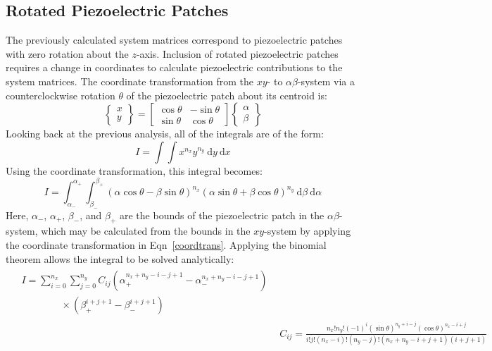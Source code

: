 \documentclass[thesis]{fputhesis}
\begin{document}
\begin{body}
\begin{appendices}
\subsection{Rotated Piezoelectric Patches}
The previously calculated system matrices correspond to piezoelectric patches with zero rotation about the $z$-axis. Inclusion of rotated piezoelectric patches requires a change in coordinates to calculate piezoelectric contributions to the system matrices. The coordinate transformation from the $xy$- to $\alpha\beta$-system via a counterclockwise rotation $\theta$ of the piezoelectric patch about its centroid is:
\begin{equation}\label{coordtrans}
\begin{Bmatrix} x \\ y \end{Bmatrix}
=\begin{bmatrix} \cos{\theta} & -\sin{\theta} \\ \sin{\theta} & \cos{\theta} \end{bmatrix}
\begin{Bmatrix} \alpha \\ \beta \end{Bmatrix}
\end{equation}
Looking back at the previous analysis, all of the integrals are of the form:
\begin{equation}
I=\int \int x^{n_x} y^{n_y} \ \text{d}y \ \text{d}x
\end{equation}
Using the coordinate transformation, this integral becomes:
\begin{equation}
I=\int_{\alpha_-}^{\alpha_+} \int_{\beta_-}^{\beta_+} (\alpha\cos{\theta}-\beta\sin{\theta})^{n_x}(\alpha\sin{\theta}+\beta\cos{\theta})^{n_y} \ \text{d}\beta \ \text{d}\alpha
\end{equation}
Here, $\alpha_-$, $\alpha_+$, $\beta_-$, and $\beta_+$ are the bounds of the piezoelectric patch in the $\alpha\beta$-system, which may be calculated from the bounds in the $xy$-system by applying the coordinate transformation in Eqn~\eqref{coordtrans}. Applying the binomial theorem allows the integral to be solved analytically:
\begin{align}
\begin{split}
&I=\sum_{i=0}^{n_x} \sum_{j=0}^{n_y} C_{ij} (\alpha_+^{n_x+n_y-i-j+1}-\alpha_-^{n_x+n_y-i-j+1}) \\
& \qquad \qquad \times (\beta_+^{i+j+1}-\beta_-^{i+j+1}) 
\end{split} \\
&C_{ij}=\frac{n_x!n_y!(-1)^i(\sin{\theta})^{n_y+i-j}(\cos{\theta})^{n_x-i+j}}{i!j!(n_x-i)!(n_y-j)!(n_x+n_y-i+j+1)(i+j+1)}
\end{align}




\end{appendices}

\end{body}
\end{document}
